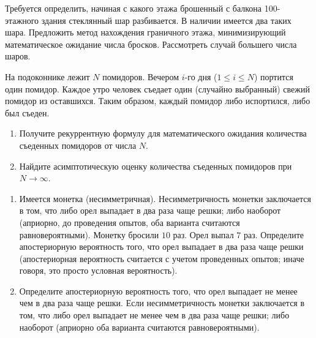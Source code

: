 \begin{problem}

Требуется определить, начиная с какого этажа брошенный с балкона 100-этажного здания стеклянный шар разбивается. В наличии имеется два таких шара. Предложить метод нахождения граничного этажа, минимизирующий математическое ожидание числа бросков. Рассмотреть случай большего числа шаров.  

\end{problem}

\begin{problem}\Star
На подоконнике лежит $N$ помидоров. Вечером $i$-го дня ($1 \leqslant i \leqslant N$) портится один помидор. Каждое утро человек съедает один (случайно выбранный) свежий помидор из оставшихся. Таким образом, каждый помидор либо испортился, либо был съеден.

\begin{enumerate}
\item Получите рекуррентную формулу для математического ожидания количества съеденных помидоров от числа $N$.
\item Найдите асимптотическую оценку количества съеденных помидоров при $N \rightarrow \infty$.
\end{enumerate}

\end{problem}

\begin{problem}
\begin{enumerate}
\item Имеется монетка (несимметричная). Несимметричность монетки заключается в том, что либо орел выпадает в два раза чаще решки; 
либо наоборот (априорно, до проведения опытов, оба варианта считаются равновероятными). Монетку бросили $10$ раз. Орел выпал $7$ раз. 
Определите апостериорную вероятность того, что орел выпадает в два раза чаще решки (апостериорная вероятность считается с учетом 
проведенных опытов; иначе говоря, это просто условная вероятность). 

\item Определите апостериорную вероятность того, что орел выпадает не менее чем в два раза чаще решки. Если несимметричность 
монетки заключается в том, что либо орел выпадает не менее чем в два раза чаще решки; либо наоборот (априорно оба варианта считаются 
равновероятными). 
\end{enumerate}
\end{problem}





